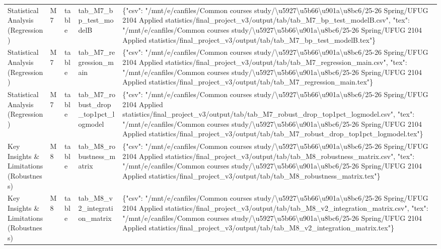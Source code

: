 \begin{tabular}{lllll}
Statistical Analysis (Regression) & M7 & table & tab\_M7\_bp\_test\_modelB & \{"csv": "/mnt/e/canfiles/Common courses study/\textbackslash u5927\textbackslash u5b66\textbackslash u901a\textbackslash u8bc6/25-26 Spring/UFUG 2104 Applied statistics/final\_project\_v3/output/tab/tab\_M7\_bp\_test\_modelB.csv", "tex": "/mnt/e/canfiles/Common courses study/\textbackslash u5927\textbackslash u5b66\textbackslash u901a\textbackslash u8bc6/25-26 Spring/UFUG 2104 Applied statistics/final\_project\_v3/output/tab/tab\_M7\_bp\_test\_modelB.tex"\} \\
Statistical Analysis (Regression) & M7 & table & tab\_M7\_regression\_main & \{"csv": "/mnt/e/canfiles/Common courses study/\textbackslash u5927\textbackslash u5b66\textbackslash u901a\textbackslash u8bc6/25-26 Spring/UFUG 2104 Applied statistics/final\_project\_v3/output/tab/tab\_M7\_regression\_main.csv", "tex": "/mnt/e/canfiles/Common courses study/\textbackslash u5927\textbackslash u5b66\textbackslash u901a\textbackslash u8bc6/25-26 Spring/UFUG 2104 Applied statistics/final\_project\_v3/output/tab/tab\_M7\_regression\_main.tex"\} \\
Statistical Analysis (Regression) & M7 & table & tab\_M7\_robust\_drop\_top1pct\_logmodel & \{"csv": "/mnt/e/canfiles/Common courses study/\textbackslash u5927\textbackslash u5b66\textbackslash u901a\textbackslash u8bc6/25-26 Spring/UFUG 2104 Applied statistics/final\_project\_v3/output/tab/tab\_M7\_robust\_drop\_top1pct\_logmodel.csv", "tex": "/mnt/e/canfiles/Common courses study/\textbackslash u5927\textbackslash u5b66\textbackslash u901a\textbackslash u8bc6/25-26 Spring/UFUG 2104 Applied statistics/final\_project\_v3/output/tab/tab\_M7\_robust\_drop\_top1pct\_logmodel.tex"\} \\
Key Insights \& Limitations (Robustness) & M8 & table & tab\_M8\_robustness\_matrix & \{"csv": "/mnt/e/canfiles/Common courses study/\textbackslash u5927\textbackslash u5b66\textbackslash u901a\textbackslash u8bc6/25-26 Spring/UFUG 2104 Applied statistics/final\_project\_v3/output/tab/tab\_M8\_robustness\_matrix.csv", "tex": "/mnt/e/canfiles/Common courses study/\textbackslash u5927\textbackslash u5b66\textbackslash u901a\textbackslash u8bc6/25-26 Spring/UFUG 2104 Applied statistics/final\_project\_v3/output/tab/tab\_M8\_robustness\_matrix.tex"\} \\
Key Insights \& Limitations (Robustness) & M8 & table & tab\_M8\_v2\_integration\_matrix & \{"csv": "/mnt/e/canfiles/Common courses study/\textbackslash u5927\textbackslash u5b66\textbackslash u901a\textbackslash u8bc6/25-26 Spring/UFUG 2104 Applied statistics/final\_project\_v3/output/tab/tab\_M8\_v2\_integration\_matrix.csv", "tex": "/mnt/e/canfiles/Common courses study/\textbackslash u5927\textbackslash u5b66\textbackslash u901a\textbackslash u8bc6/25-26 Spring/UFUG 2104 Applied statistics/final\_project\_v3/output/tab/tab\_M8\_v2\_integration\_matrix.tex"\} \\
\bottomrule
\end{tabular}
